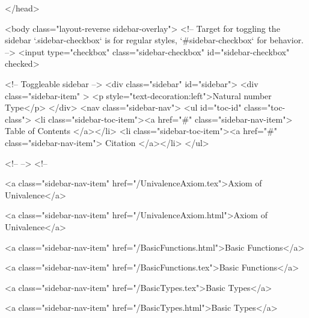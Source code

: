   
</head>




  <body class="layout-reverse sidebar-overlay">
    <!-- Target for toggling the sidebar `.sidebar-checkbox` is for regular
     styles, `#sidebar-checkbox` for behavior. -->
<input type="checkbox" class="sidebar-checkbox" id="sidebar-checkbox" checked>

<!-- Toggleable sidebar -->
<div class="sidebar" id="sidebar">
  <div class="sidebar-item" >
    <p style="text-decoration:left">Natural number Type</p>
  </div>
  <nav class="sidebar-nav">
    <ul id="toc-id" class="toc-class">
  <li class="sidebar-toc-item"><a href="#" class="sidebar-nav-item"> Table of Contents </a></li>
  <li class="sidebar-toc-item"><a href="#" class="sidebar-nav-item"> Citation </a></li>
</ul>


    <!--  -->
    <!-- 
      
    
      
    
      
    
      
    
      
        
      
    
      
        
          <a class="sidebar-nav-item" href="/UnivalenceAxiom.tex">Axiom of Univalence</a>
        
      
    
      
        
          <a class="sidebar-nav-item" href="/UnivalenceAxiom.html">Axiom of Univalence</a>
        
      
    
      
        
          <a class="sidebar-nav-item" href="/BasicFunctions.html">Basic Functions</a>
        
      
    
      
        
          <a class="sidebar-nav-item" href="/BasicFunctions.tex">Basic Functions</a>
        
      
    
      
        
          <a class="sidebar-nav-item" href="/BasicTypes.tex">Basic Types</a>
        
      
    
      
        
          <a class="sidebar-nav-item" href="/BasicTypes.html">Basic Types</a>
        
      
    
